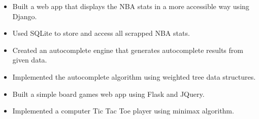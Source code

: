 \vspace{5pt}

\begin{itemize}
	\item Built a web app that displays the NBA stats in a more accessible way using Django.
    \item Used SQLite to store and access all scrapped NBA stats.
\end{itemize}

\divider


\vspace{5pt}

\begin{itemize}
	\item Created an autocomplete engine that generates autocomplete results from given data.
	\item Implemented the autocomplete algorithm using weighted tree data structures.
\end{itemize}

\divider


\vspace{5pt}

\begin{itemize}
	\item Built a simple board games web app using Flask and JQuery.
	\item Implemented a computer Tic Tac Toe player using minimax algorithm.
\end{itemize}
